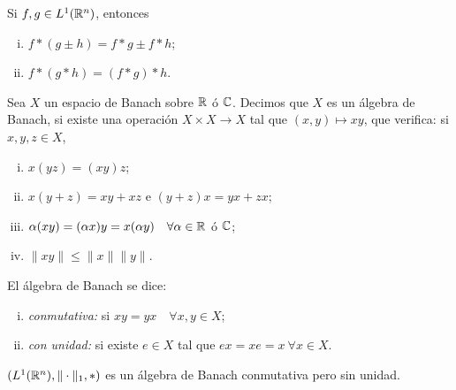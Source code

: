 \begin{property}
	Si $f,g \in L^{1}(\mathbb{R}^{n})$, entonces
	\begin{enumerate}[i.]
		\item $f * (g \pm h) = f * g \pm f * h$;

		\item $f * (g * h) = (f * g) * h$.
	\end{enumerate}
\end{property}

\begin{definition}
	Sea $X$ un espacio de Banach sobre $\mathbb{R}$ ó $\mathbb{C}$. Decimos que $X$ es un álgebra de Banach, si existe una operación $X \times X \to X$ tal que $(x,y) \mapsto xy$, que verifica: si $x, y, z \in X$,
	\begin{enumerate}[i.]
		\item $x(yz) = (xy)z$;

		\item $x(y + z) = xy + xz$ e $(y + z)x = yx + zx$;

		\item $\alpha(xy) = (\alpha x)y = x(\alpha y) \quad \forall \alpha \in \mathbb{R}$ ó $\mathbb{C}$;

		\item $\| xy \| \leq \| x \| \| y \|$.
	\end{enumerate}
	El álgebra de Banach se dice:
	\begin{enumerate}[i.]
		\item \textit{conmutativa:} si $xy = yx \quad \forall x,y \in X$;

		\item \textit{con unidad:} si existe $e \in X$ tal que $ex = xe = x \ \forall x \in X$.
	\end{enumerate}
\end{definition}

\begin{remark}
	$(L^{1}(\mathbb{R}^{n}), \| \cdot \|_{1}, *)$ es un álgebra de Banach conmutativa pero sin unidad.
\end{remark}
